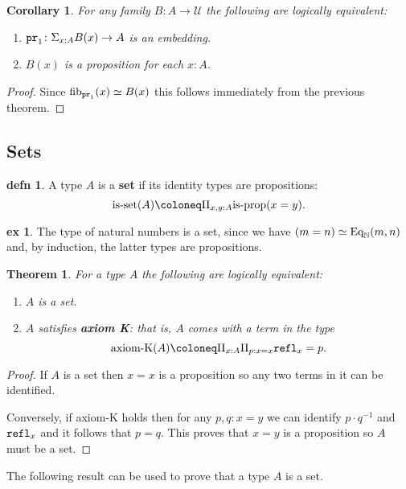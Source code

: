 \documentclass{amsart}
\theoremstyle{theorem}
\newtheorem*{thm}{Theorem}
\newtheorem*{cor}{Corollary}
\theoremstyle{definition}
\newtheorem*{defn}{defn}
\newtheorem*{ex}{ex}
\theoremstyle{remark}
\newcommand{\0}{\mathbbe{0}}
\newcommand{\1}{\mathbbe{1}}
\newcommand{\2}{\mathbbe{2}}
\newcommand{\3}{\mathbbe{3}}
\newcommand{\4}{\mathbbe{4}}
\newcommand{\term}[1]{{\textup{\texttt{#1}}}}
\newcommand{\type}[1]{{\textup{#1}}}
\newcommand{\bN}{{\mathbb{N}}}
\newcommand{\pr}{\term{pr}}
\newcommand{\refl}{\term{refl}}
\newcommand{\UU}{{\mathcal{U}}}
\newcommand{\Eq}{\textup{\text{Eq}}}
\newcommand{\is}[1]{\type{is-{#1}}}
\newcommand{\isprop}{\type{is-prop}}
\newcommand{\fib}{\type{fib}}
\begin{document}
\begin{cor} For any family $B : A \to \UU$ the following are logically equivalent:
\begin{enumerate}
\item $\pr_1 \colon \Sigma_{x:A} B(x) \to A$ is an embedding.
\item $B(x)$ is a proposition for each $x:A$.
\end{enumerate}
\end{cor}
\begin{proof}
Since $\fib_{\pr_1}(x) \simeq B(x)$ this follows immediately from the previous theorem.
\end{proof}

\subsection*{Sets}

\begin{defn} A type $A$ is a \textbf{set} if its identity types are propositions:
\[ \is{set}(A) \coloneq \Pi_{x,y:A} \isprop(x=y).\]
\end{defn}

\begin{ex} The type of natural numbers is a set, since we have $(m=n) \simeq \Eq_\bN(m,n)$ and, by induction, the latter types are propositions.
\end{ex}

\begin{thm} For a type $A$ the following are logically equivalent:
\begin{enumerate}
\item $A$ is a set.
\item $A$ satisfies \textbf{axiom K}: that is, $A$ comes with a term in the type
\[ \type{axiom-K}(A) \coloneq \Pi_{x:A} \Pi_{p : x =x} \refl_x = p.\]
\end{enumerate}
\end{thm}
\begin{proof}
If $A$ is a set then $x=x$ is a proposition so any two terms in it can be identified.

Conversely, if axiom-K holds then for any $p,q : x =y$ we can identify $p \cdot q^{-1}$ and $\refl_x$ and it follows that $p=q$. This proves that $x=y$ is a proposition so $A$ must be a set.
\end{proof}

The following result can be used to prove that a type $A$ is a set.
\end{document}
